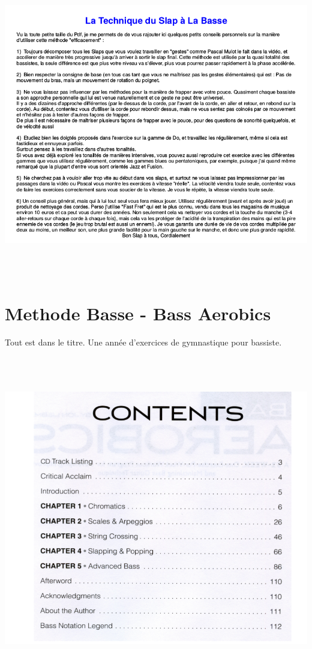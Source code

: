 \documentclass[a4paper]{book}
\begin{document}
\begin{center}
\includegraphics[width=17cm,height=13.4cm]{lebluessupportsmethodes-img156.png}
\end{center}
\clearpage\section{Methode Basse - Bass Aerobics}
Tout est dans le titre. Une ann\'ee d{\textquoteright}exercices de
gymnastique pour bassiste.



\begin{center}
\includegraphics[width=17cm,height=14.198cm]{lebluessupportsmethodes-img157.png}
\end{center}
\end{document}
